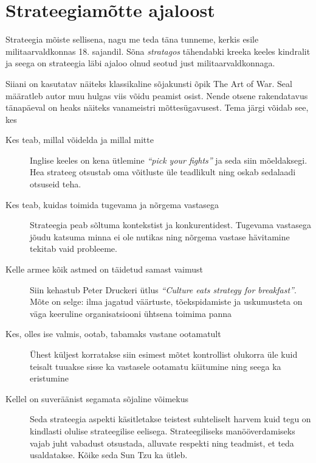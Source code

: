 \documentclass{tufte-book}
\begin{document}
\section{Strateegiamõtte ajaloost}
Strateegia mõiste sellisena, nagu me teda täna tunneme, kerkis esile militaarvaldkonnas 18. sajandil. Sõna \emph{stratagos} tähendabki kreeka keeles kindralit ja seega on strateegia läbi ajaloo olnud seotud just militaarvaldkonnaga.

Siiani on kasutatav näiteks klassikaline sõjakunsti õpik The Art of War\cite{tzu2013art}. Seal määratleb autor muu hulgas viis võidu peamist osist. Nende otsene rakendatavus tänapäeval on heaks näiteks vanameistri mõttesügavusest. Tema järgi võidab see, kes

\begin{description}
	\item[Kes teab, millal võidelda ja millal mitte] Inglise keeles on kena ütlemine \emph{\enquote{pick your fights}} ja seda siin mõeldaksegi. Hea strateeg otsustab oma võitluste üle teadlikult ning oskab sedalaadi otsuseid teha.
	\item[Kes teab, kuidas toimida tugevama ja nõrgema vastasega] Strateegia peab sõltuma kontekstist ja konkurentidest. Tugevama vastasega jõudu katsuma minna ei ole nutikas ning nõrgema vastase hävitamine tekitab vaid probleeme.
	\item[Kelle armee kõik astmed on täidetud samast vaimust] Siin kehastub Peter Druckeri ütlus \emph{\enquote{Culture eats strategy for breakfast}}. Mõte on selge: ilma jagatud väärtuste, tõekspidamiste ja uskumusteta on väga keeruline organisatsiooni ühtsena toimima panna
	\item[Kes, olles ise valmis, ootab, tabamaks vastane ootamatult] Ühest küljest korratakse siin esimest mõtet kontrollist olukorra üle kuid teisalt tuuakse sisse ka vastasele ootamatu käitumine ning seega ka eristumine
	\item[Kellel on suveräänist segamata sõjaline võimekus] Seda strateegia aspekti käsitletakse teistest suhteliselt harvem kuid tegu on kindlasti olulise strateegilise eelisega. Strateegiliseks manööverdamiseks vajab juht vabadust otsustada, alluvate respekti ning teadmist, et teda usaldatakse. Kõike seda Sun Tzu ka ütleb. 
\end{description}
\end{document}
